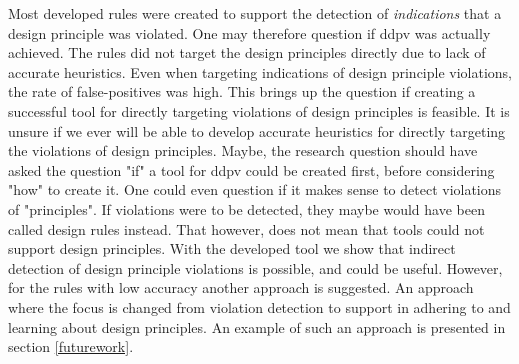 \documentclass[pdftex,10pt,b5paper,twoside]{report}
\begin{document}
Most developed rules were created to support the detection of \textit{indications} that a design principle was violated. One may therefore question if \gls{ddpv} was actually achieved. The rules did not target the design principles directly due to lack of accurate heuristics. Even when targeting indications of design principle violations, the rate of false-positives was high. This brings up the question if creating a successful tool for directly targeting violations of design principles is feasible. It is unsure if we ever will be able to develop accurate heuristics for directly targeting the violations of design principles. Maybe, the research question should have asked the question "if" a tool for \gls{ddpv} could be created first, before considering "how" to create it. One could even question if it makes sense to detect violations of "principles". If violations were to be detected, they maybe would have been called design rules instead. That however, does not mean that tools could not support design principles. With the developed tool we show that indirect detection of design principle violations is possible, and could be useful. However, for the rules with low accuracy another approach is suggested. An approach where the focus is changed from violation detection to support in adhering to and learning about design principles. An example of such an approach is presented in section \ref{futurework}.


\end{document}
